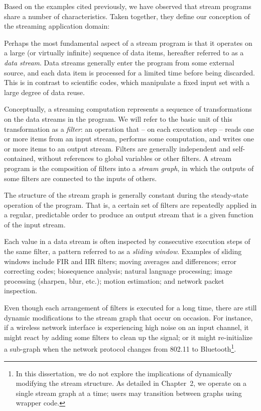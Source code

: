 Based on the examples cited previously, we have observed that stream
programs share a number of characteristics.  Taken together, they
define our conception of the streaming application domain:

\mybegin

  Perhaps the most fundamental
  aspect of a stream program is that it operates on a large (or
  virtually infinite) sequence of data items, hereafter referred to as
  a {\it data stream}.  Data streams generally enter the program from
  some external source, and each data item is processed for a limited
  time before being discarded.  This is in contrast to scientific
  codes, which manipulate a fixed input set with a large degree of
  data reuse.

  Conceptually, a streaming
  computation represents a sequence of transformations on the data
  streams in the program.  We will refer to the basic unit of this
  transformation as a {\it filter}: an operation that -- on each
  execution step -- reads one or more items from an input stream,
  performs some computation, and writes one or more items to an output
  stream.  Filters are generally independent and self-contained,
  without references to global variables or other filters.  A stream
  program is the composition of filters into a {\it stream graph}, in
  which the outputs of some filters are connected to the inputs of
  others.

  The structure of the stream
  graph is generally constant during the steady-state operation of the
  program.  That is, a certain set of filters are repeatedly applied
  in a regular, predictable order to produce an output stream that is
  a given function of the input stream.

  Each value in a data stream
is often inspected by consecutive execution steps of the same filter,
a pattern referred to as a {\it sliding window}.  Examples of sliding
windows include FIR and IIR filters; moving averages and differences;
error correcting codes; biosequence analysis; natural language
processing; image processing (sharpen, blur, etc.); motion estimation;
and network packet inspection.

  Even though
  each arrangement of filters is executed for a long time, there are
  still dynamic modifications to the stream graph that occur on
  occasion.  For instance, if a wireless network interface is
  experiencing high noise on an input channel, it might react by
  adding some filters to clean up the signal; or it might
  re-initialize a sub-graph when the network protocol changes from
  802.11 to Bluetooth\footnote{In this dissertation, we do not explore
    the implications of dynamically modifying the stream structure.
    As detailed in Chapter~2, we operate on a single stream graph at a
    time; users may transition between graphs using wrapper code.}.

